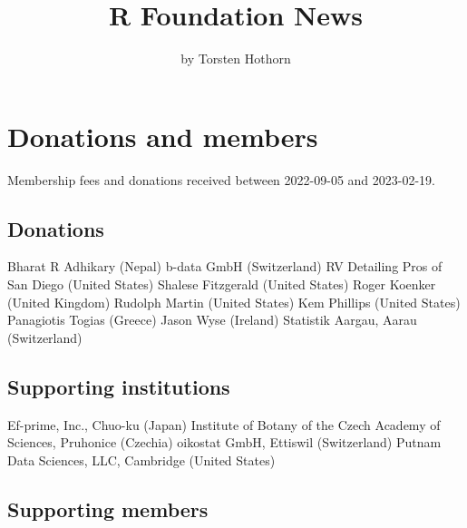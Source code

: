 
\title{R Foundation News}
\author{by Torsten Hothorn}

\maketitle

\section{Donations and members}

Membership fees and donations received between 
2022-09-05 and 2023-02-19.

\subsection{Donations}


Bharat R Adhikary (Nepal)
b-data GmbH (Switzerland)
RV Detailing Pros of San Diego (United States)
Shalese Fitzgerald (United States)
Roger Koenker (United Kingdom)
Rudolph Martin (United States)
Kem Phillips (United States)
Panagiotis Togias (Greece)
Jason Wyse (Ireland)
Statistik Aargau, Aarau (Switzerland)

\subsection{Supporting institutions}


Ef-prime, Inc., Chuo-ku (Japan)
Institute of Botany of the Czech Academy of Sciences, Pruhonice (Czechia)
oikostat GmbH, Ettiswil (Switzerland)
Putnam Data Sciences, LLC, Cambridge (United States)

\subsection{Supporting members}


